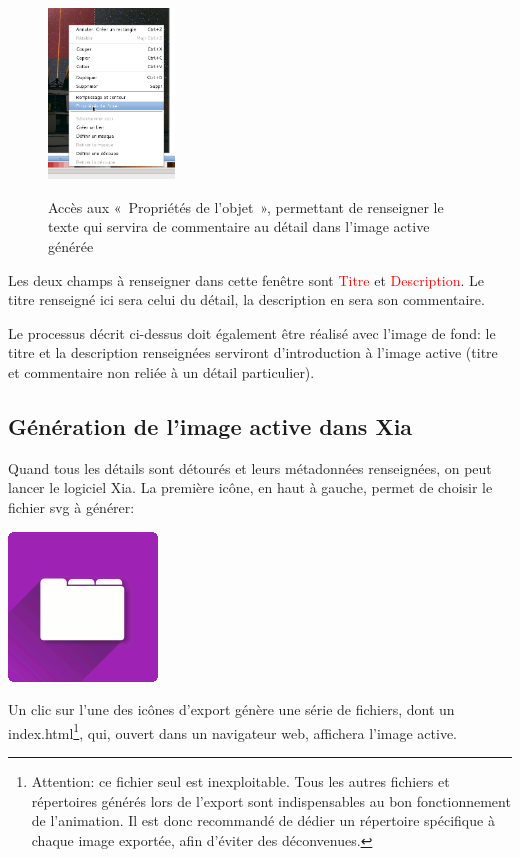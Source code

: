 \documentclass[a4paper,12pt]{report}
\newcommand{\chemin}[1]{\textcolor{red}{#1}}
\begin{document}
\begin{figure}[htp]
 \centering
 \caption{Accès aux «~Propriétés de l'objet~», permettant de renseigner le texte 
 qui servira de commentaire au détail dans l'image active générée}
 \includegraphics[width=0.3\textwidth]{./images/proprietes_objet}
 \label{proprietes_objet}
\end{figure}

Les deux champs à renseigner dans cette fenêtre sont \chemin{Titre} et \chemin{Description}.
Le titre renseigné ici sera celui du détail, la description en sera son commentaire.

Le processus décrit ci-dessus doit également être réalisé avec l'image de fond: le titre et la description renseignées
serviront d'introduction à l'image active (titre et commentaire non reliée à un détail particulier).

\subsection{Génération de l'image active dans Xia}

Quand tous les détails sont détourés et leurs métadonnées renseignées, on peut lancer le logiciel Xia.
La première icône, en haut à gauche, permet de choisir le fichier svg à générer:
\begin{center}
\includegraphics[scale=0.4]{./images/xia_open} 
\end{center}

Un clic sur l'une des icônes d'export génère une série de fichiers, dont un index.html\footnote{Attention: ce fichier seul est inexploitable. Tous les autres fichiers et répertoires générés lors de l'export sont indispensables au bon fonctionnement de l'animation. Il est donc recommandé de dédier un répertoire spécifique à chaque image exportée, afin d'éviter des déconvenues.}, qui, ouvert dans un navigateur
web, affichera l'image active.
\end{document}
